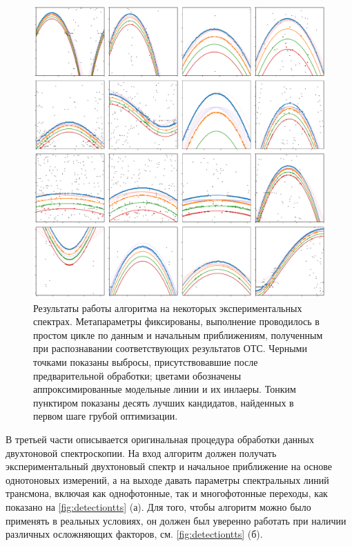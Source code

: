\documentclass[14pt, a4paper]{extarticle}
\begin{document}
\begin{figure}
	\includegraphics[width=1\linewidth]{Pictures/two_tone_fits}
	\caption{Результаты работы алгоритма на некоторых экспериментальных спектрах. Метапараметры фиксированы, выполнение проводилось в простом цикле по данным и начальным приближениям, полученным при распознавании соответствующих результатов ОТС. Черными точками показаны выбросы, присутствовавшие после предварительной обработки; цветами обозначены аппроксимированные модельные линии и их инлаеры. Тонким пунктиром показаны десять лучших кандидатов, найденных в первом шаге грубой оптимизации.}
	\label{fig:twotonefits}
\end{figure}


В третьей части описывается оригинальная процедура обработки данных двухтоновой спектроскопии. На вход алгоритм должен получать экспериментальный двухтоновый спектр и начальное приближение на основе однотоновых измерений, а на выходе давать параметры спектральных линий трансмона, включая как однофотонные, так и многофотонные переходы, как показано на \autoref{fig:detectiontts} (а). Для того, чтобы алгоритм можно было применять в реальных условиях, он должен был уверенно работать при наличии различных осложняющих факторов, см. \autoref{fig:detectiontts} (б).
	
\end{document}
